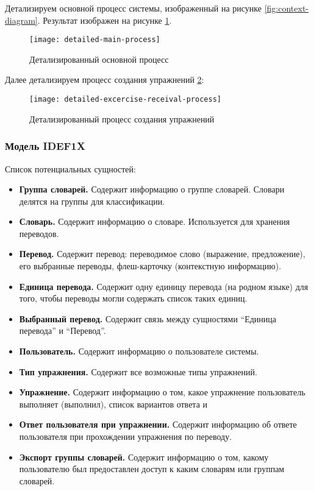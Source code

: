 \documentclass[a4paper,14pt]{extarticle}
\begin{document}
Детализируем основной процесс системы, изображенный на рисунке
\ref{fig:context-diagram}. Результат изображен на рисунке \ref{fig:detailed-main-process}.

\begin{figure}[H]
    \centering
    \texttt{[image: detailed-main-process]}
    \caption{Детализированный основной процесс}
    \label{fig:detailed-main-process}
\end{figure}

Далее детализируем процесс создания упражнений \ref{fig:detailed-excercise-receival-process}:
\begin{figure}[H]
    \centering
    \texttt{[image: detailed-excercise-receival-process]}
    \caption{Детализированный процесс создания упражнений}
    \label{fig:detailed-excercise-receival-process}
\end{figure}

\subsubsection{Модель IDEF1X}
Список потенциальных сущностей:

\begin{itemize}
    \item \textbf{Группа словарей.} Содержит информацию о группе словарей.
          Словари делятся на группы для классификации.
    \item \textbf{Словарь.} Содержит информацию о словаре. Используется для
          хранения переводов.
    \item \textbf{Перевод.} Содержит перевод: переводимое слово (выражение,
          предложение), его выбранные переводы, флеш-карточку (контекстную
          информацию).
    \item \textbf{Единица перевода.} Содержит одну единицу перевода (на родном
          языке) для того, чтобы переводы могли содержать список таких единиц.
    \item \textbf{Выбранный перевод.} Содержит связь между сущностями
          \enquote{Единица перевода} и \enquote{Перевод}.
    \item \textbf{Пользователь.} Содержит информацию о пользователе системы.
    \item \textbf{Тип упражнения.} Содержит все возможные типы упражнений.
    \item \textbf{Упражнение.} Содержит информацию о том, какое упражнение
          пользователь выполняет (выполнил), список вариантов ответа и 
    \item \textbf{Ответ пользователя при упражнении.} Содержит информацию об
          ответе пользователя при прохождении упражнения по переводу.
    \item \textbf{Экспорт группы словарей.} Содержит информацию о том, какому
          пользователю был предоставлен доступ к каким словарям или группам
          словарей.
\end{itemize}
\end{document}
